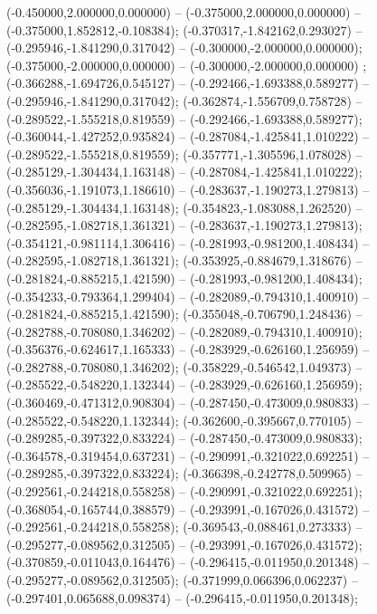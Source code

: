 (-0.450000,2.000000,0.000000) -- (-0.375000,2.000000,0.000000) -- (-0.375000,1.852812,-0.108384);
 (-0.370317,-1.842162,0.293027) -- (-0.295946,-1.841290,0.317042) -- (-0.300000,-2.000000,0.000000);
 (-0.375000,-2.000000,0.000000) -- (-0.300000,-2.000000,0.000000) ;
 (-0.366288,-1.694726,0.545127) -- (-0.292466,-1.693388,0.589277) -- (-0.295946,-1.841290,0.317042);
 (-0.362874,-1.556709,0.758728) -- (-0.289522,-1.555218,0.819559) -- (-0.292466,-1.693388,0.589277);
 (-0.360044,-1.427252,0.935824) -- (-0.287084,-1.425841,1.010222) -- (-0.289522,-1.555218,0.819559);
 (-0.357771,-1.305596,1.078028) -- (-0.285129,-1.304434,1.163148) -- (-0.287084,-1.425841,1.010222);
 (-0.356036,-1.191073,1.186610) -- (-0.283637,-1.190273,1.279813) -- (-0.285129,-1.304434,1.163148);
 (-0.354823,-1.083088,1.262520) -- (-0.282595,-1.082718,1.361321) -- (-0.283637,-1.190273,1.279813);
 (-0.354121,-0.981114,1.306416) -- (-0.281993,-0.981200,1.408434) -- (-0.282595,-1.082718,1.361321);
 (-0.353925,-0.884679,1.318676) -- (-0.281824,-0.885215,1.421590) -- (-0.281993,-0.981200,1.408434);
 (-0.354233,-0.793364,1.299404) -- (-0.282089,-0.794310,1.400910) -- (-0.281824,-0.885215,1.421590);
 (-0.355048,-0.706790,1.248436) -- (-0.282788,-0.708080,1.346202) -- (-0.282089,-0.794310,1.400910);
 (-0.356376,-0.624617,1.165333) -- (-0.283929,-0.626160,1.256959) -- (-0.282788,-0.708080,1.346202);
 (-0.358229,-0.546542,1.049373) -- (-0.285522,-0.548220,1.132344) -- (-0.283929,-0.626160,1.256959);
 (-0.360469,-0.471312,0.908304) -- (-0.287450,-0.473009,0.980833) -- (-0.285522,-0.548220,1.132344);
 (-0.362600,-0.395667,0.770105) -- (-0.289285,-0.397322,0.833224) -- (-0.287450,-0.473009,0.980833);
 (-0.364578,-0.319454,0.637231) -- (-0.290991,-0.321022,0.692251) -- (-0.289285,-0.397322,0.833224);
 (-0.366398,-0.242778,0.509965) -- (-0.292561,-0.244218,0.558258) -- (-0.290991,-0.321022,0.692251);
 (-0.368054,-0.165744,0.388579) -- (-0.293991,-0.167026,0.431572) -- (-0.292561,-0.244218,0.558258);
 (-0.369543,-0.088461,0.273333) -- (-0.295277,-0.089562,0.312505) -- (-0.293991,-0.167026,0.431572);
 (-0.370859,-0.011043,0.164476) -- (-0.296415,-0.011950,0.201348) -- (-0.295277,-0.089562,0.312505);
 (-0.371999,0.066396,0.062237) -- (-0.297401,0.065688,0.098374) -- (-0.296415,-0.011950,0.201348);
